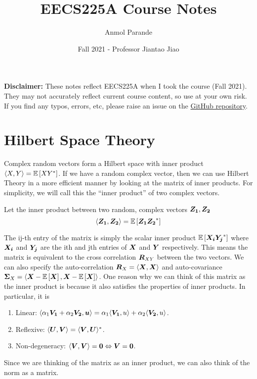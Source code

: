 

\title{EECS225A Course Notes}
\author{Anmol Parande}
\date{Fall 2021 - Professor Jiantao Jiao}
\maketitle
\textbf{Disclaimer: }These notes reflect EECS225A when I took the course (Fall 2021). They may not accurately reflect current course content, so use at your own risk.
If you find any typos, errors, etc, please raise an issue on the \href{https://github.com/parandea17/BerkeleyNotes}{GitHub repository}.
\tableofcontents
\newpage
\section{Hilbert Space Theory}
Complex random vectors form a Hilbert space with inner product $\langle X, Y \rangle = \mathbb{E}\left[XY^*\right]$.
If we have a random complex vector, then we can use Hilbert Theory in a more efficient manner by looking at the matrix of inner products.
For simplicity, we will call this the ``inner product'' of two complex vectors.
\begin{definition}
	Let the inner product between two random, complex vectors $\boldsymbol{Z_1}, \boldsymbol{Z_2}$ \[
		\langle \boldsymbol{Z_1}, \boldsymbol{Z_2} \rangle = \mathbb{E}\left[\boldsymbol{Z_1}\boldsymbol{Z_2}^*\right]
	\]
	\label{defn:inner-product}
\end{definition}
The ij-th entry of the matrix is simply the scalar inner product $\mathbb{E}\left[\boldsymbol{X_i}\boldsymbol{Y_j}^*\right]$ where $\boldsymbol{X_i}$ and $\boldsymbol{Y_j}$ are the ith and jth entries of $\boldsymbol{X}$ and $\boldsymbol{Y}$ respectively.
This means the matrix is equivalent to the cross correlation $\boldsymbol{R}_{XY}$ between the two vectors.
We can also specify the auto-correlation $\boldsymbol{R}_X = \langle \boldsymbol{X}, \boldsymbol{X} \rangle$ and auto-covariance $\boldsymbol{\Sigma}_X = \langle \boldsymbol{X} - \mathbb{E}\left[\boldsymbol{X}\right], \boldsymbol{X} - \mathbb{E}\left[\boldsymbol{X}\right] \rangle$.
One reason why we can think of this matrix as the inner product is because it also satisfies the properties of inner products.
In particular, it is
\begin{enumerate}
	\item Linear: $\langle \alpha_1\boldsymbol{V_1}+\alpha_2\boldsymbol{V_2}, \boldsymbol{u} \rangle = \alpha_1\langle \boldsymbol{V_1}, u \rangle + \alpha_2\langle \boldsymbol{V_2}, u \rangle$.
	\item Reflexive: $\langle \boldsymbol{U}, \boldsymbol{V} \rangle = \langle \boldsymbol{V}, \boldsymbol{U} \rangle^*$.
	\item Non-degeneracy: $\langle \boldsymbol{V}, \boldsymbol{V} \rangle = \boldsymbol{0} \Leftrightarrow \boldsymbol{V} = \boldsymbol{0}$.
\end{enumerate}
Since we are thinking of the matrix as an inner product, we can also think of the norm as a matrix.
